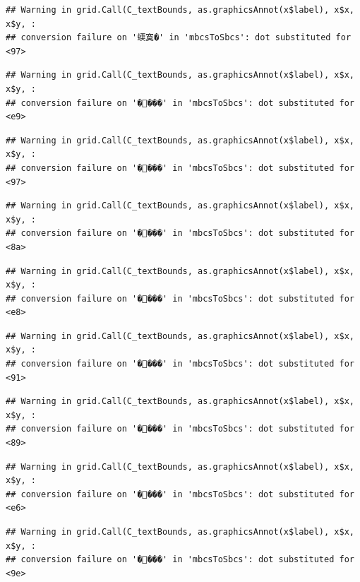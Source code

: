 \documentclass[
]{article}
\begin{document}
\begin{verbatim}
## Warning in grid.Call(C_textBounds, as.graphicsAnnot(x$label), x$x, x$y, :
## conversion failure on '蝡寞�' in 'mbcsToSbcs': dot substituted for <97>
\end{verbatim}

\begin{verbatim}
## Warning in grid.Call(C_textBounds, as.graphicsAnnot(x$label), x$x, x$y, :
## conversion failure on '����' in 'mbcsToSbcs': dot substituted for <e9>
\end{verbatim}

\begin{verbatim}
## Warning in grid.Call(C_textBounds, as.graphicsAnnot(x$label), x$x, x$y, :
## conversion failure on '����' in 'mbcsToSbcs': dot substituted for <97>
\end{verbatim}

\begin{verbatim}
## Warning in grid.Call(C_textBounds, as.graphicsAnnot(x$label), x$x, x$y, :
## conversion failure on '����' in 'mbcsToSbcs': dot substituted for <8a>
\end{verbatim}

\begin{verbatim}
## Warning in grid.Call(C_textBounds, as.graphicsAnnot(x$label), x$x, x$y, :
## conversion failure on '����' in 'mbcsToSbcs': dot substituted for <e8>
\end{verbatim}

\begin{verbatim}
## Warning in grid.Call(C_textBounds, as.graphicsAnnot(x$label), x$x, x$y, :
## conversion failure on '����' in 'mbcsToSbcs': dot substituted for <91>
\end{verbatim}

\begin{verbatim}
## Warning in grid.Call(C_textBounds, as.graphicsAnnot(x$label), x$x, x$y, :
## conversion failure on '����' in 'mbcsToSbcs': dot substituted for <89>
\end{verbatim}

\begin{verbatim}
## Warning in grid.Call(C_textBounds, as.graphicsAnnot(x$label), x$x, x$y, :
## conversion failure on '����' in 'mbcsToSbcs': dot substituted for <e6>
\end{verbatim}

\begin{verbatim}
## Warning in grid.Call(C_textBounds, as.graphicsAnnot(x$label), x$x, x$y, :
## conversion failure on '����' in 'mbcsToSbcs': dot substituted for <9e>
\end{verbatim}
\end{document}
